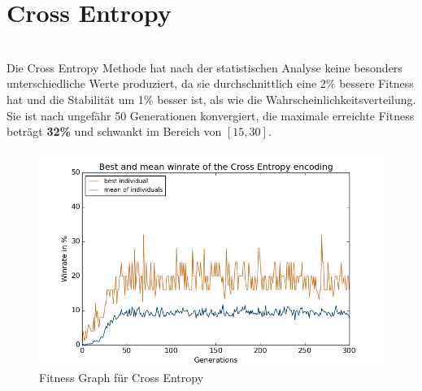             \section{Cross Entropy}
                \begin{multicols}{2}
                    \noindent
                    \\[5mm]
                    Die Cross Entropy Methode hat nach der statistischen Analyse keine besonders unterschiedliche Werte produziert, da sie durchschnittlich eine 2\% bessere Fitness hat und die Stabilität um 1\% besser ist, als wie die Wahrscheinlichkeitsverteilung.\\[2mm]
                    Sie ist nach ungefähr 50 Generationen konvergiert, die maximale erreichte Fitness beträgt \textbf{32\%} und schwankt im Bereich von $[15,30]$. 
                    \begin{figure}[H]
                       \includegraphics[scale=0.5]{../pictures/summary/cross-entropy-fitness.png}
                       \caption{Fitness Graph für Cross Entropy}\label{fig:graph-ce}
                    \end{figure}
                \end{multicols}

